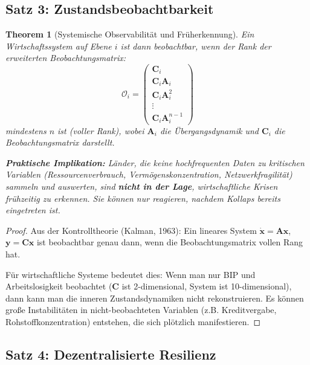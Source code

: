 \documentclass[a4paper, 12pt, twoside, openright]{report}
\newtheorem{theorem}{Theorem}[section]
\theoremstyle{definition}
\theoremstyle{definition}
\begin{document}
\subsection{Satz 3: Zustandsbeobachtbarkeit}

\begin{theorem}[Systemische Observabilität und Früherkennung]
\label{thm:observabilitaet}
Ein Wirtschaftssystem auf Ebene $i$ ist dann beobachtbar, wenn der Rank der erweiterten Beobachtungsmatrix:
\begin{equation}
\mathcal{O}_i = \begin{pmatrix}
\mathbf{C}_i \\
\mathbf{C}_i \mathbf{A}_i \\
\mathbf{C}_i \mathbf{A}_i^2 \\
\vdots \\
\mathbf{C}_i \mathbf{A}_i^{n-1}
\end{pmatrix}
\end{equation}
mindestens $n$ ist (voller Rank), wobei $\mathbf{A}_i$ die Übergangsdynamik und $\mathbf{C}_i$ die Beobachtungsmatrix darstellt.

\textbf{Praktische Implikation:} Länder, die keine hochfrequenten Daten zu kritischen Variablen (Ressourcenverbrauch, Vermögenskonzentration, Netzwerkfragilität) sammeln und auswerten, sind \textbf{nicht in der Lage}, wirtschaftliche Krisen frühzeitig zu erkennen. Sie können nur reagieren, nachdem Kollaps bereits eingetreten ist.
\end{theorem}

\begin{proof}
Aus der Kontrolltheorie (Kalman, 1963): Ein lineares System $\dot{\mathbf{x}} = \mathbf{A}\mathbf{x}$, $\mathbf{y} = \mathbf{C}\mathbf{x}$ ist beobachtbar genau dann, wenn die Beobachtungsmatrix vollen Rang hat. 

Für wirtschaftliche Systeme bedeutet dies: Wenn man nur BIP und Arbeitslosigkeit beobachtet ($\mathbf{C}$ ist 2-dimensional, System ist 10-dimensional), dann kann man die inneren Zustandsdynamiken nicht rekonstruieren. Es können große Instabilitäten in nicht-beobachteten Variablen (z.B. Kreditvergabe, Rohstoffkonzentration) entstehen, die sich plötzlich manifestieren.
\end{proof}

\subsection{Satz 4: Dezentralisierte Resilienz}
\end{document}
